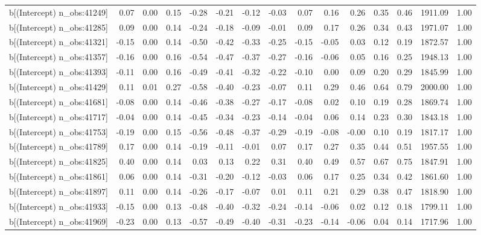 \begin{table}[ht]
\begin{tabular}{rrrrrrrrrrrrrrr}
  b[(Intercept) n\_obs:41249] & 0.07 & 0.00 & 0.15 & -0.28 & -0.21 & -0.12 & -0.03 & 0.07 & 0.16 & 0.26 & 0.35 & 0.46 & 1911.09 & 1.00 \\ 
  b[(Intercept) n\_obs:41285] & 0.09 & 0.00 & 0.14 & -0.24 & -0.18 & -0.09 & -0.01 & 0.09 & 0.17 & 0.26 & 0.34 & 0.43 & 1971.07 & 1.00 \\ 
  b[(Intercept) n\_obs:41321] & -0.15 & 0.00 & 0.14 & -0.50 & -0.42 & -0.33 & -0.25 & -0.15 & -0.05 & 0.03 & 0.12 & 0.19 & 1872.57 & 1.00 \\ 
  b[(Intercept) n\_obs:41357] & -0.16 & 0.00 & 0.16 & -0.54 & -0.47 & -0.37 & -0.27 & -0.16 & -0.06 & 0.05 & 0.16 & 0.25 & 1948.13 & 1.00 \\ 
  b[(Intercept) n\_obs:41393] & -0.11 & 0.00 & 0.16 & -0.49 & -0.41 & -0.32 & -0.22 & -0.10 & 0.00 & 0.09 & 0.20 & 0.29 & 1845.99 & 1.00 \\ 
  b[(Intercept) n\_obs:41429] & 0.11 & 0.01 & 0.27 & -0.58 & -0.40 & -0.23 & -0.07 & 0.11 & 0.29 & 0.46 & 0.64 & 0.79 & 2000.00 & 1.00 \\ 
  b[(Intercept) n\_obs:41681] & -0.08 & 0.00 & 0.14 & -0.46 & -0.38 & -0.27 & -0.17 & -0.08 & 0.02 & 0.10 & 0.19 & 0.28 & 1869.74 & 1.00 \\ 
  b[(Intercept) n\_obs:41717] & -0.04 & 0.00 & 0.14 & -0.45 & -0.34 & -0.23 & -0.14 & -0.04 & 0.06 & 0.14 & 0.23 & 0.30 & 1843.18 & 1.00 \\ 
  b[(Intercept) n\_obs:41753] & -0.19 & 0.00 & 0.15 & -0.56 & -0.48 & -0.37 & -0.29 & -0.19 & -0.08 & -0.00 & 0.10 & 0.19 & 1817.17 & 1.00 \\ 
  b[(Intercept) n\_obs:41789] & 0.17 & 0.00 & 0.14 & -0.19 & -0.11 & -0.01 & 0.07 & 0.17 & 0.27 & 0.35 & 0.44 & 0.51 & 1957.55 & 1.00 \\ 
  b[(Intercept) n\_obs:41825] & 0.40 & 0.00 & 0.14 & 0.03 & 0.13 & 0.22 & 0.31 & 0.40 & 0.49 & 0.57 & 0.67 & 0.75 & 1847.91 & 1.00 \\ 
  b[(Intercept) n\_obs:41861] & 0.06 & 0.00 & 0.14 & -0.31 & -0.20 & -0.12 & -0.03 & 0.06 & 0.17 & 0.25 & 0.34 & 0.42 & 1861.60 & 1.00 \\ 
  b[(Intercept) n\_obs:41897] & 0.11 & 0.00 & 0.14 & -0.26 & -0.17 & -0.07 & 0.01 & 0.11 & 0.21 & 0.29 & 0.38 & 0.47 & 1818.90 & 1.00 \\ 
  b[(Intercept) n\_obs:41933] & -0.15 & 0.00 & 0.13 & -0.48 & -0.40 & -0.32 & -0.24 & -0.14 & -0.06 & 0.02 & 0.12 & 0.18 & 1799.11 & 1.00 \\ 
  b[(Intercept) n\_obs:41969] & -0.23 & 0.00 & 0.13 & -0.57 & -0.49 & -0.40 & -0.31 & -0.23 & -0.14 & -0.06 & 0.04 & 0.14 & 1717.96 & 1.00 \\ 

\end{tabular}
\end{table}
